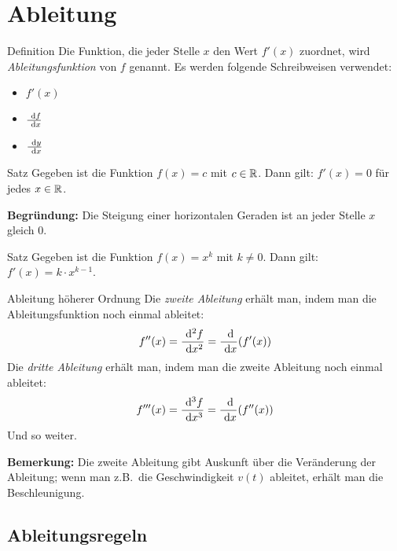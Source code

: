 \section{Ableitung}\label{sec:ableitung}

\begin{definition}{Definition}
    Die Funktion, die jeder Stelle $x$ den Wert $f'(x)$ zuordnet, wird \emph{Ableitungsfunktion} von $f$ genannt.
    Es werden folgende Schreibweisen verwendet:
    \begin{multicols}{5}
        \begin{itemize}
            \item $f'(x)$
            \item $\frac{\ \mathrm{d} f}{\ \mathrm{d} x}$
            \item $\frac{\ \mathrm{d} y}{\ \mathrm{d} x}$
        \end{itemize}
    \end{multicols}
\end{definition}

\begin{definition}{Satz}
    Gegeben ist die Funktion $f(x) = c$ mit $c \in \mathbb{R}$.
    Dann gilt: $f'(x) = 0$ für jedes $x \in \mathbb{R}$.
\end{definition}

\textbf{Begründung:} Die Steigung einer horizontalen Geraden ist an jeder Stelle $x$ gleich $0$.

\begin{definition}{Satz}
    Gegeben ist die Funktion $f(x) = x^k$ mit $k \neq 0$.
    Dann gilt: $f'(x) = k \cdot x^{k-1}$.
\end{definition}

\begin{definition}{Ableitung höherer Ordnung}
    Die \emph{zweite Ableitung} erhält man, indem man die Ableitungsfunktion noch einmal ableitet: \[f''(x) = \frac{\ \mathrm{d}^2 f}{\ \mathrm{d} x^2} = \frac{\ \mathrm{d}}{\ \mathrm{d} x}(f'(x))\]
    Die \emph{dritte Ableitung} erhält man, indem man die zweite Ableitung noch einmal ableitet: \[f'''(x) = \frac{\ \mathrm{d}^3 f}{\ \mathrm{d} x^3} = \frac{\ \mathrm{d}}{\ \mathrm{d} x}(f''(x))\]
    Und so weiter.
\end{definition}

\textbf{Bemerkung:} Die zweite Ableitung gibt Auskunft über die Veränderung der Ableitung;
wenn man z.B.\ die Geschwindigkeit $v(t)$ ableitet, erhält man die Beschleunigung.

\subsection{Ableitungsregeln}\label{subsec:ableitungsregeln}

